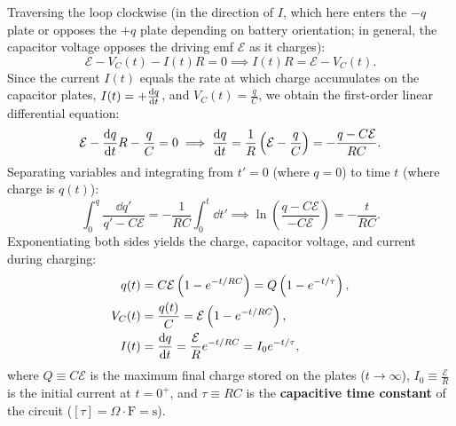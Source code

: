 Traversing the loop clockwise (in the direction of $I$, which here enters the $-q$ plate or opposes the $+q$ plate depending on battery orientation; in general, the capacitor voltage opposes the driving emf $\mathcal{E}$ as it charges):
\begin{equation}
    \mathcal{E} - V_C(t) - I(t) R = 0 \implies I(t) R = \mathcal{E} - V_C(t).
\end{equation}
Since the current $I(t)$ equals the rate at which charge accumulates on the capacitor plates, $I(t) = +\dv{q}{t}$, and $V_C(t) = \frac{q}{C}$, we obtain the first-order linear differential equation:
\begin{equation}
    \mathcal{E} - \dv{q}{t} R - \frac{q}{C} = 0 \implies \dv{q}{t} = \frac{1}{R}\left( \mathcal{E} - \frac{q}{C} \right) = -\frac{q - C\mathcal{E}}{R C}.
\end{equation}
Separating variables and integrating from $t' = 0$ (where $q = 0$) to time $t$ (where charge is $q(t)$):
\begin{equation}
    \int_0^q \frac{\dd{q'}}{q' - C\mathcal{E}} = -\frac{1}{R C} \int_0^t \dd{t'} \implies \ln\left( \frac{q - C\mathcal{E}}{-C\mathcal{E}} \right) = -\frac{t}{R C}.
\end{equation}
Exponentiating both sides yields the charge, capacitor voltage, and current during charging:
\begin{align}
    q(t) &= C\mathcal{E} \left( 1 - e^{-t / RC} \right) = Q \left( 1 - e^{-t / \tau} \right), \\
    V_C(t) &= \frac{q(t)}{C} = \mathcal{E} \left( 1 - e^{-t / RC} \right), \\
    I(t) &= \dv{q}{t} = \frac{\mathcal{E}}{R} e^{-t / RC} = I_0 e^{-t / \tau},
\end{align}
where $Q \equiv C\mathcal{E}$ is the maximum final charge stored on the plates ($t \to \infty$), $I_0 \equiv \frac{\mathcal{E}}{R}$ is the initial current at $t = 0^+$, and $\tau \equiv R C$ is the \textbf{capacitive time constant} of the circuit ($[\tau] = \Omega \cdot \text{F} = \text{s}$).


